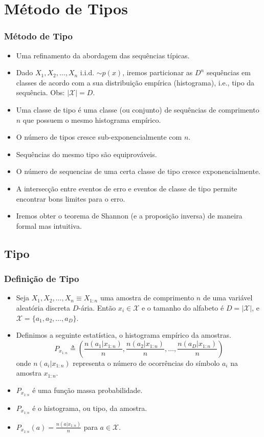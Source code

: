 \section{Método de Tipos}

\begin{frame}[allowframebreaks]
  \frametitle{Método de Tipo}
  \begin{itemize}
  \item Uma refinamento da abordagem das sequências típicas.
  \item Dado $X_1,X_2,\ldots,X_n$ i.i.d. $\sim p(x)$, iremos particionar as $D^n$ sequências em classes de acordo com
	a sua distribuição empírica (histograma), i.e., tipo da sequência. Obs: $\vert \mathcal{X} \vert = D$.
  \item Uma classe de tipo é uma classe (ou conjunto) de sequências de comprimento $n$ que possuem o mesmo histograma empírico.
  \item O número de tipos cresce sub-exponencialmente com $n$.
  \item Sequências do mesmo tipo são equiprováveis.
  \item O número de sequencias de uma certa classe de tipo cresce exponencialmente.
  \item A intersecção entre eventos de erro e eventos de classe de tipo permite encontrar bons limites para o erro.
  \item Iremos obter o teorema de Shannon (e a proposição inversa) de maneira formal mas intuitiva.
  \end{itemize}
\end{frame}


\subsection{Tipo}
\begin{frame}[allowframebreaks]
  \frametitle{Definição de Tipo}
  \begin{itemize}
  \item Seja $X_1, X_2, \ldots, X_n \equiv X_{1:n}$ uma amostra de comprimento $n$ de uma variável aleatória discreta $D$-ária.
	Então $x_i \in \mathcal{X}$ e o tamanho do alfabeto é $D=\vert \mathcal{X} \vert$, e $\mathcal{X}=\{a_1, a_2, \ldots, a_D\}$.
  \item Definimos a seguinte estatística, o histograma empírico da amostras.
	\begin{equation}
	P_{x_{1:n}} \triangleq \left( \frac{n(a_1|x_{1:n})}{n}, \frac{n(a_2|x_{1:n})}{n}, \ldots, \frac{n(a_D|x_{1:n})}{n} \right)
	\end{equation}
	onde $n(a_i|x_{1:n})$ representa o número de ocorrências do símbolo $a_i$ na amostra $x_{1:n}$.
  \item $P_{x_{1:n}}$ é uma função massa probabilidade.
  \item $P_{x_{1:n}}$ é o histograma, ou tipo, da amostra.
  \item $P_{x_{1:n}}(a) = \frac{n(a|x_{1:n})}{n}$ para $a \in \mathcal{X}$.
  \end{itemize}
\end{frame}


